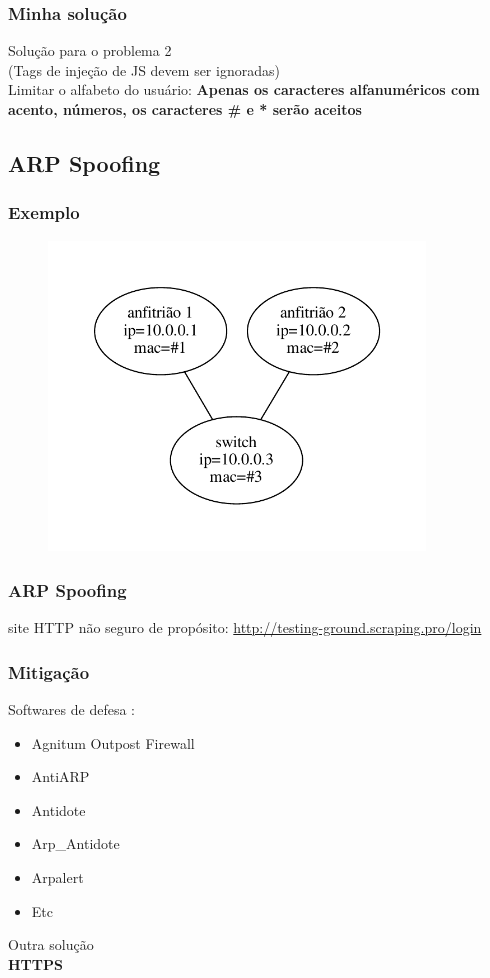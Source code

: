 \documentclass{beamer}
\begin{document}
\begin{frame}
	\frametitle{Minha solução}
	Solução para o problema 2\\
	(Tags de injeção de JS devem ser ignoradas)\\
	Limitar o alfabeto do usuário:
	\textbf{Apenas os caracteres alfanuméricos com acento, números, os caracteres \# e * serão aceitos}

\end{frame}

\subsection{ARP Spoofing}
\begin{frame}
\frametitle{Exemplo}
\begin{figure}[htp]
		\includegraphics[width=10cm]{topo.pdf}
	\end{figure}
\end{frame}

\begin{frame}
\frametitle{ARP Spoofing}
	site HTTP não seguro de propósito:
	\url{http://testing-ground.scraping.pro/login}
\end{frame}

\begin{frame}
\frametitle{Mitigação}
	Softwares de defesa :
	\begin{itemize}
		\item Agnitum Outpost Firewall
		\item AntiARP
		\item Antidote
		\item Arp\_Antidote
		\item Arpalert
		\item Etc
	\end{itemize}
	Outra solução\\
	\textbf{HTTPS}
\end{frame}
\end{document}
